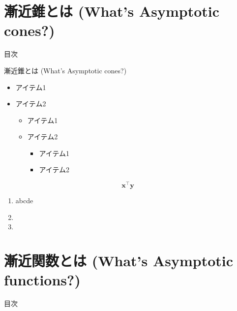 \documentclass[aspectratio=169, dvipdfmx, 11pt]{beamer} %
\begin{document}
\section{漸近錐とは (What's Asymptotic cones?) }
\begin{frame}{目次}
    \tableofcontents[currentsection]
\end{frame}

\begin{frame}{漸近錐とは (What's Asymptotic cones?) }
    \begin{itemize}
    \item アイテム1
    \item \alert{アイテム2}
        \begin{itemize}
        \item アイテム1
        \item \alert{アイテム2}
            \begin{itemize}
            \item アイテム1
            \item \alert{アイテム2}
            \end{itemize}
        \end{itemize}
    \end{itemize}
    \[
    \bm{x}^\top\bm{y}
    \]
    \begin{enumerate}
    \item abcde
    \item {}
    \item
    \end{enumerate}
\end{frame}

\section{漸近関数とは (What's Asymptotic functions?) }
\begin{frame}{目次}
    \tableofcontents[currentsection]
\end{frame}
\end{document}
